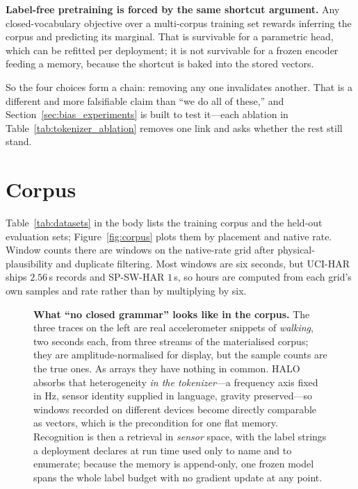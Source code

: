 \textbf{Label-free pretraining is forced by the same shortcut argument.} Any closed-vocabulary
objective over a multi-corpus training set rewards inferring the corpus and predicting its
marginal. That is survivable for a parametric head, which can be refitted per deployment; it is
not survivable for a frozen encoder feeding a memory, because the shortcut is baked into the
stored vectors.

So the four choices form a chain: removing any one invalidates another. That is a different and
more falsifiable claim than ``we do all of these,'' and Section~\ref{sec:bias_experiments} is
built to test it---each ablation in Table~\ref{tab:tokenizer_ablation} removes one link and asks
whether the rest still stand.

\section{Corpus}
\label{app:corpus}

Table~\ref{tab:datasets} in the body lists the training corpus and the held-out evaluation sets;
Figure~\ref{fig:corpus} plots them by placement and native rate. Window counts there are windows
on the native-rate grid after physical-plausibility and duplicate filtering. Most windows are six
seconds, but UCI-HAR ships $2.56$\,s records and SP-SW-HAR $1$\,s, so hours are computed from each
grid's own samples and rate rather than by multiplying by six.

\begin{figure}[h]
    \centering
    \setlength{\abovecaptionskip}{2pt}
  
\end{figure}

\begin{figure}[t]
    \centering
    \setlength{\abovecaptionskip}{4pt}
    \setlength{\belowcaptionskip}{-6pt}
  \resizebox{0.92\textwidth}{!}{}
  \caption{\textbf{What ``no closed grammar'' looks like in the corpus.} The three traces on the
  left are real accelerometer snippets of \emph{walking}, two seconds each, from three streams of
  the materialised corpus; they are amplitude-normalised for display, but the sample counts are
  the true ones. As arrays they have nothing in common. HALO absorbs that heterogeneity
  \emph{in the tokenizer}---a frequency axis fixed in Hz, sensor identity supplied in language,
  gravity preserved---so windows recorded on different devices become directly comparable as
  vectors, which is the precondition for one flat memory. Recognition is then a retrieval in
  \emph{sensor} space, with the label strings a deployment declares at run time used only to name
  and to enumerate; because the memory is append-only, one frozen model spans the whole label
  budget with no gradient update at any point.}
  \label{fig:hook}
\end{figure}

